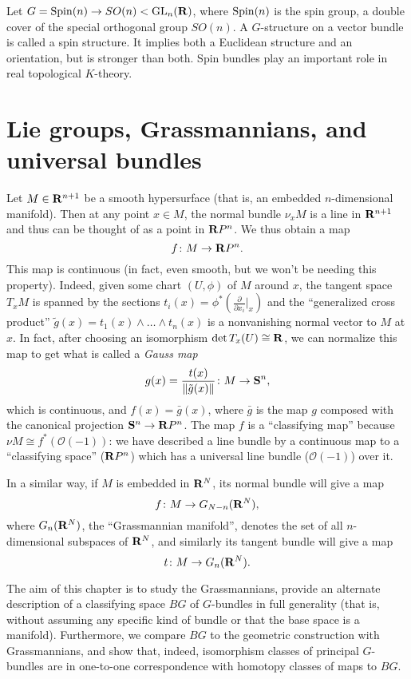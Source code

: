 \documentclass[a4paper,openany]{scrbook}
\begin{document}
\begin{example}
Let $G = \Spin(n) \to SO(n) < \GL_n(\R)$, where $\Spin(n)$ is the spin group, a double cover of the special orthogonal group $SO(n)$. A $G$-structure on a vector bundle is called a spin structure. It implies both a Euclidean structure and an orientation, but is stronger than both. Spin bundles play an important role in real topological $K$-theory.
\end{example}


\chapter{Lie groups, Grassmannians, and universal bundles}

Let $M \in \R^{n+1}$ be a smooth hypersurface (that is, an embedded $n$-dimensional manifold). Then at any point $x \in M$, the normal bundle $\nu_x M$ is a line in $\R^{n+1}$ and thus can be thought of as a point in $\R P^n$. We thus obtain a map
\[
f\colon M \to \R P^n.
\]
This map is continuous (in fact, even smooth, but we won't be needing this property). Indeed, given some chart $(U,\phi)$ of $M$ around $x$, the tangent space $T_xM$ is spanned by the sections $t_i(x) = \phi^*(\frac{\partial}{\partial x_i}|_x)$ and the ``generalized cross product'' $\tilde g(x) = t_1(x) \wedge \dots \wedge t_n(x)$ is a nonvanishing normal vector to $M$ at $x$. In fact, after choosing an isomorphism $\det T_x(U) \cong \R$, we can normalize this map to get what is called a \emph{Gauss map}
\[
g(x) = \frac{t(x)}{\|\tilde g(x)\|} \colon M \to \S^n,
\]
which is continuous, and $f(x) = \bar g(x)$, where $\bar g$ is the map $g$ composed with the canonical projection $\S^n \to \R P^n$. The map $f$ is a ``classifying map'' because $\nu M \cong f^*(\mathcal O(-1))$: we have described a line bundle by a continuous map to a ``classifying space'' ($\R P^n$) which has a universal line bundle ($\mathcal O(-1)$) over it.

In a similar way, if $M$ is embedded in $\R^N$, its normal bundle will give a map
\[
f\colon M \to G_{N-n}(\R^N),
\]
where $G_n(\R^N)$, the ``Grassmannian manifold'', denotes the set of all $n$-dimensional subspaces of $\R^N$, and similarly its tangent bundle will give a map
\[
t\colon M \to G_n(\R^N).
\]

The aim of this chapter is to study the Grassmannians, provide an alternate description of a classifying space $BG$ of $G$-bundles in full generality (that is, without assuming any specific kind of bundle or that the base space is a manifold). Furthermore, we compare $BG$ to the geometric construction with Grassmannians, and show that, indeed, isomorphism classes of principal $G$-bundles are in one-to-one correspondence with homotopy classes of maps to $BG$.
\end{document}
